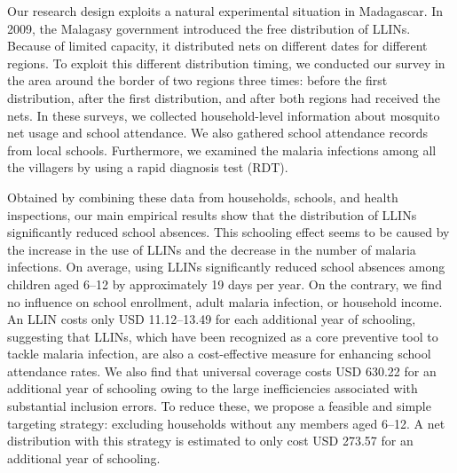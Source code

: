 \documentclass[fleqn,11pt]{article}
\begin{document}


Our research design exploits a natural experimental situation in Madagascar. In 2009, the Malagasy government introduced the free distribution of LLINs. Because of limited capacity, it distributed nets on different dates for different regions. To exploit this different distribution timing, we conducted our survey in the area around the border of two regions three times: before the first distribution, after the first distribution, and after both regions had received the nets. In these surveys, we collected household-level information about mosquito net usage and school attendance. We also gathered school attendance records from local schools. Furthermore, we examined the malaria infections among all the villagers by using a rapid diagnosis test (RDT).


Obtained by combining these data from households, schools, and health inspections, our main empirical results show that the distribution of LLINs significantly reduced school absences. This schooling effect seems to be caused by the increase in the use of LLINs and the decrease in the number of malaria infections. On average, using LLINs significantly reduced school absences among children aged 6--12 by approximately 19 days per year. On the contrary, we find no influence on school enrollment, adult malaria infection, or household income. An LLIN costs only USD 11.12--13.49 for each additional year of schooling, suggesting that LLINs, which have been recognized as a core preventive tool to tackle malaria infection, are also a cost-effective measure for enhancing school attendance rates. We also find that universal coverage costs USD 630.22 for an additional year of schooling owing to the large inefficiencies associated with substantial inclusion errors. To reduce these, we propose a feasible and simple targeting strategy: excluding households without any members aged 6--12. A net distribution with this strategy is estimated to only cost USD 273.57 for an additional year of schooling. 
\end{document}
